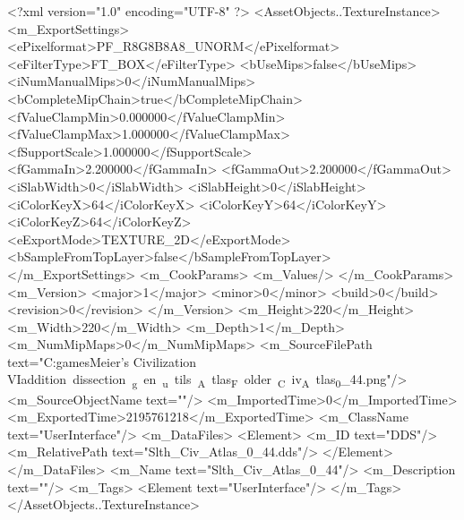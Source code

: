 <?xml version="1.0" encoding="UTF-8" ?>
<AssetObjects..TextureInstance>
	<m_ExportSettings>
		<ePixelformat>PF_R8G8B8A8_UNORM</ePixelformat>
		<eFilterType>FT_BOX</eFilterType>
		<bUseMips>false</bUseMips>
		<iNumManualMips>0</iNumManualMips>
		<bCompleteMipChain>true</bCompleteMipChain>
		<fValueClampMin>0.000000</fValueClampMin>
		<fValueClampMax>1.000000</fValueClampMax>
		<fSupportScale>1.000000</fSupportScale>
		<fGammaIn>2.200000</fGammaIn>
		<fGammaOut>2.200000</fGammaOut>
		<iSlabWidth>0</iSlabWidth>
		<iSlabHeight>0</iSlabHeight>
		<iColorKeyX>64</iColorKeyX>
		<iColorKeyY>64</iColorKeyY>
		<iColorKeyZ>64</iColorKeyZ>
		<eExportMode>TEXTURE_2D</eExportMode>
		<bSampleFromTopLayer>false</bSampleFromTopLayer>
	</m_ExportSettings>
	<m_CookParams>
		<m_Values/>
	</m_CookParams>
	<m_Version>
		<major>1</major>
		<minor>0</minor>
		<build>0</build>
		<revision>0</revision>
	</m_Version>
	<m_Height>220</m_Height>
	<m_Width>220</m_Width>
	<m_Depth>1</m_Depth>
	<m_NumMipMaps>0</m_NumMipMaps>
	<m_SourceFilePath text="C:\Users\Sam\Documents\my games\Sid Meier's Civilization VI\Mods\unit addition dissection\python_gen\build_utils\CIV_Atlas_Folder\Slth_Civ_Atlas_0_44.png"/>
	<m_SourceObjectName text=""/>
	<m_ImportedTime>0</m_ImportedTime>
	<m_ExportedTime>2195761218</m_ExportedTime>
	<m_ClassName text="UserInterface"/>
	<m_DataFiles>
		<Element>
			<m_ID text="DDS"/>
			<m_RelativePath text="Slth_Civ_Atlas_0_44.dds"/>
		</Element>
	</m_DataFiles>
	<m_Name text="Slth_Civ_Atlas_0_44"/>
	<m_Description text=""/>
	<m_Tags>
		<Element text="UserInterface"/>
	</m_Tags>
</AssetObjects..TextureInstance>

